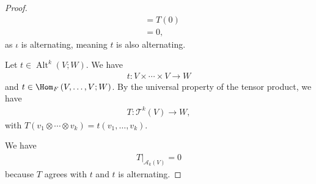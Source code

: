 \documentclass[10pt]{mypackage}
\DeclareMathOperator{\Alt}{Alt}
\begin{document}
\begin{proof}
\begin{align*}
                                  &= T\left(0\right)\\
                                  &= 0,
    \end{align*}
    as $\iota$ is alternating, meaning $t$ is also alternating.
  \item Let $t\in \Alt^{k}\left(V;W\right)$. We have
    \begin{align*}
      t: V\times\cdots\times V\rightarrow W
    \end{align*}
    and $t\in \Hom_{F}\left(V,\dots,V;W\right)$. By the universal property of the tensor product, we have
    \begin{align*}
      T: \mathcal{T}^{k}\left(V\right)\rightarrow W,
    \end{align*}
    with $T\left(v_1\otimes\cdots\otimes v_k\right) = t\left(v_1,\dots,v_k\right)$.\newline

    We have
    \begin{align*}
      T|_{\mathcal{A}_{k}\left(V\right)} = 0
    \end{align*}
    because $T$ agrees with $t$ and $t$ is alternating.
  \end{proof}
\end{document}
